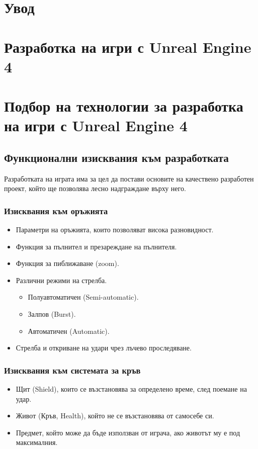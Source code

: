 \documentclass[14pt]{extreport}
\begin{document}
\chapter{Увод}

\chapter{Разработка на игри с Unreal Engine 4}

\chapter{Подбор на технологии за разработка на игри с Unreal Engine 4}

\section{Функционални изисквания към разработката}

Разработката на играта има за цел да постави основите на качествено разработен проект, който ще позволява лесно надграждане върху него.

\subsection{Изисквания към оръжията}
\begin{itemize}
	\item Параметри на оръжията, които позволяват висока разновидност.
	\item Функция за пълнител и презареждане на пълнителя.
	\item Функция за пиближаване (zoom).
	\item Различни режими на стрелба.
	\begin{itemize}
		\item Полуавтоматичен (Semi-automatic).
		\item Залпов (Burst).
		\item Автоматичен (Automatic).
	\end{itemize}
	\item Стрелба и откриване на удари чрез лъчево проследяване.
\end{itemize}

\subsection{Изисквания към системата за кръв}
\begin{itemize}
	\item Щит (Shield), които се възстановява за определено време, след поемане на удар.
	\item Живот (Кръв, Health), който не се възстановява от самосебе си.
	\item Предмет, който може да бъде използван от играча, ако животът му е под максималния.
\end{itemize}
\end{document}
